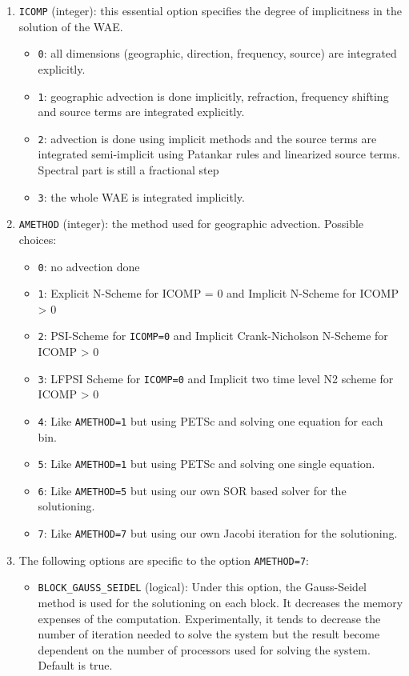 \documentclass[12pt]{amsart}
\begin{document}
\begin{enumerate}
\item {\tt ICOMP} (integer): this essential option specifies the degree of implicitness in the solution of the WAE.
  \begin{itemize}
  \item {\tt 0}: all dimensions (geographic, direction, frequency, source) are integrated explicitly.
  \item {\tt 1}: geographic advection is done implicitly, refraction, frequency shifting and source terms are integrated explicitly.
  \item {\tt 2}: advection is done using implicit methods and the source terms are integrated semi-implicit using Patankar rules and linearized source terms. Spectral part is still a fractional step
  \item {\tt 3}: the whole WAE is integrated implicitly.
  \end{itemize}
\item {\tt AMETHOD} (integer): the method used for geographic advection. Possible choices:
  \begin{itemize}
  \item {\tt 0}: no advection done
  \item {\tt 1}: Explicit N-Scheme for ICOMP = 0 and Implicit N-Scheme for ICOMP > 0
  \item {\tt 2}: PSI-Scheme for {\tt ICOMP=0} and Implicit Crank-Nicholson N-Scheme for ICOMP > 0
  \item {\tt 3}: LFPSI Scheme for {\tt ICOMP=0} and Implicit two time level N2 scheme for ICOMP > 0
  \item {\tt 4}: Like {\tt AMETHOD=1} but using PETSc and solving one equation for each bin.
  \item {\tt 5}: Like {\tt AMETHOD=1} but using PETSc and solving one single equation.
  \item {\tt 6}: Like {\tt AMETHOD=5} but using our own SOR based solver for the solutioning.
  \item {\tt 7}: Like {\tt AMETHOD=7} but using our own Jacobi iteration for the solutioning.
  \end{itemize}
\item The following options are specific to the option {\tt AMETHOD=7}:
  \begin{itemize}
  \item {\tt BLOCK\_GAUSS\_SEIDEL} (logical): Under this option, the Gauss-Seidel method is used for the solutioning on each block. It decreases the memory expenses of the computation. Experimentally, it tends to decrease the number of iteration needed to solve the system but the result become dependent on the number of processors used for solving the system. Default is true.

\end{itemize}
\end{enumerate}
\end{document}
